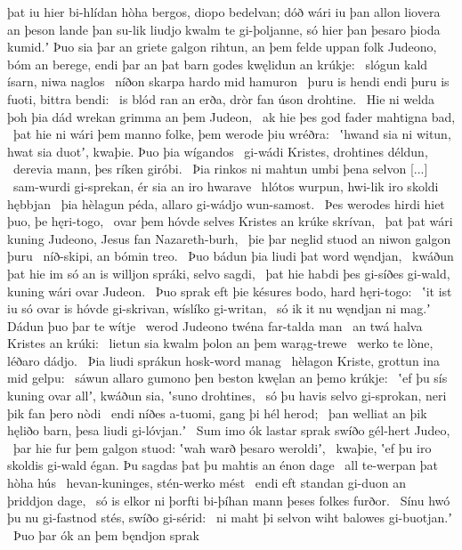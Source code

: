þat iu hier bi-hlídan hòha bergos,
diopo bedelvan; dóð wári iu þan allon
liovera an þeson lande þan su-lik liudjo kwalm
te gi-þoljanne, só hier þan þesaro þioda kumid.ʼ
Þuo sia þar an griete galgon rihtun,
an þem felde uppan folk Judeono,
bóm an berege, endi þar an þat barn godes
kwęlidun an krúkje: \hld\ slógun kald ísarn,
niwa naglos \hld\ níðon skarpa
hardo mid hamuron \hld\ þuru is hendi endi þuru is fuoti,
bittra bendi: \hld\ is blód ran an erða,
dròr fan úson drohtine. \hld\ Hie ni welda þoh þia dád wrekan
grimma an þem Judeon, \hld\ ak hie þes god fader
mahtigna bad, \hld\ þat hie ni wári þem manno folke,
þem werode þiu wréðra: \hld\ ʽhwand sia ni witun, hwat sia duotʼ, kwaþie.
Þuo þia wígandos \hld\ gi-wádi Kristes,
drohtines déldun, \hld\ derevia mann,
þes ríken giróbi. \hld\ Þia rinkos ni mahtun
umbi þena selvon {[...]} \hld\ sam-wurdi gi-sprekan,
ér sia an iro hwarave \hld\ hlótos wurpun,
hwi-lik iro skoldi hębbjan \hld\ þia hèlagun péda,
allaro gi-wádjo wun-samost. \hld\ Þes werodes hirdi
hiet þuo, þe hęri-togo, \hld\ ovar þem hóvde selves
Kristes an krúke skrívan, \hld\ þat þat wári kuning Judeono,
Jesus fan Nazareth-burh, \hld\ þie þar neglid stuod
an niwon galgon þuru \hld\ níð-skipi,
an bómin treo. \hld\ Þuo bádun þia liudi
þat word węndjan, \hld\ kwáðun þat hie im só an is willjon spráki,
selvo sagdi, \hld\ þat hie habdi þes gi-síðes gi-wald,
kuning wári ovar Judeon. \hld\ Þuo sprak eft þie késures bodo,
hard hęri-togo: \hld\ ʽit ist iu só ovar is hóvde gi-skrivan,
wíslíko gi-writan, \hld\ só ik it nu węndjan ni mag.ʼ
Dádun þuo þar te wítje \hld\ werod Judeono
twéna far-talda man \hld\ an twá halva
Kristes an krúki: \hld\ lietun sia kwalm þolon
an þem warạg-trewe \hld\ werko te lòne,
léðaro dádjo. \hld\ Þia liudi sprákun
hosk-word manag \hld\ hèlagon Kriste,
grottun ina mid gelpu: \hld\ sáwun allaro gumono þen beston
kwęlan an þemo krúkje: \hld\ ʽef þu sís kuning ovar allʼ, kwáðun sia,
ʽsuno drohtines, \hld\ só þu havis selvo gi-sprokan,
neri þik fan þero nòdi \hld\ endi níðes a-tuomi,
gang þi hél herod; \hld\ þan welliat an þik hęliðo barn,
þesa liudi gi-lóvjan.ʼ \hld\ Sum imo ók lastar sprak
swíðo gél-hert Judeo, \hld\ þar hie fur þem galgon stuod:
ʽwah warð þesaro weroldiʼ, \hld\ kwaþie, ʽef þu iro skoldis gi-wald égan.
Þu sagdas þat þu mahtis an énon dage \hld\ all te-werpan
þat hòha hús \hld\ hevan-kuninges,
stén-werko mést \hld\ endi eft standan gi-duon
an þriddjon dage, \hld\ só is elkor ni þorfti bi-þíhan mann
þeses folkes furðor. \hld\ Sínu hwó þu nu gi-fastnod stés,
swíðo gi-sérid: \hld\ ni maht þi selvon wiht
balowes gi-buotjan.ʼ \hld\ Þuo þar ók an þem bęndjon sprak
